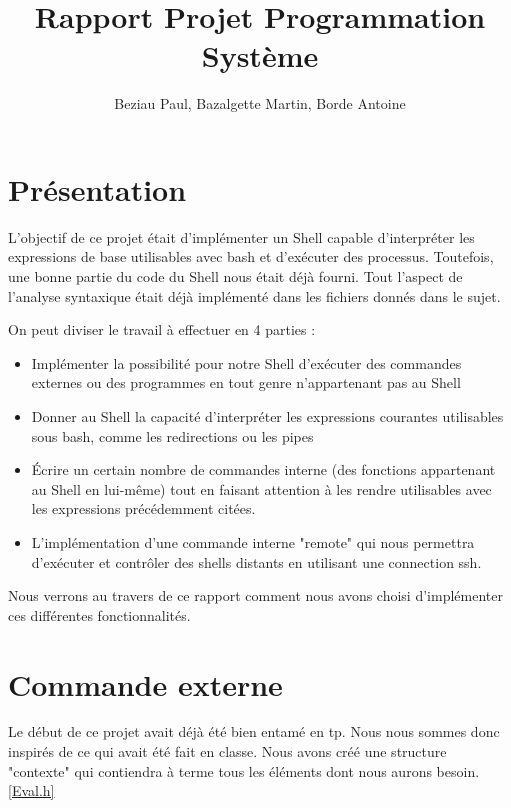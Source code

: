\documentclass[12pt]{article}
\title{Rapport Projet Programmation Système}
\author{Beziau Paul, Bazalgette Martin, Borde Antoine}
\begin{document}
\maketitle
\tableofcontents

\newpage
\section{Présentation}

L'objectif de ce projet était d'implémenter un Shell capable d'interpréter les expressions de base
utilisables avec bash et d'exécuter des processus. Toutefois, une bonne partie du code du Shell
nous était déjà fourni. Tout l'aspect de l'analyse syntaxique était déjà implémenté dans les fichiers
donnés dans le sujet.\newline

On peut diviser le travail à effectuer en 4 parties :
\begin{itemize}
 \item Implémenter la possibilité pour notre Shell d'exécuter des
 commandes externes ou des programmes en tout genre n'appartenant pas au Shell
 \item Donner au Shell la capacité d'interpréter les expressions courantes
 utilisables sous bash, comme les redirections ou les pipes
 \item Écrire un certain nombre de commandes interne (des fonctions appartenant
 au Shell en lui-même) tout en faisant attention à les rendre utilisables avec
 les expressions précédemment citées.
 \item L'implémentation d'une commande interne "remote" qui nous permettra d'exécuter
 et contrôler des shells distants en utilisant une connection ssh.\newline 
\end{itemize}

Nous verrons au travers de ce rapport comment nous avons choisi d'implémenter ces différentes
fonctionnalités.


\newpage

\section{Commande externe}
 
 Le début de ce projet avait déjà été bien entamé en tp. Nous nous sommes donc
 inspirés de ce qui avait été fait en classe. Nous avons créé une structure "contexte"
 qui contiendra à terme tous les éléments dont nous aurons besoin. \ref{Eval.h}
 
\end{document}
